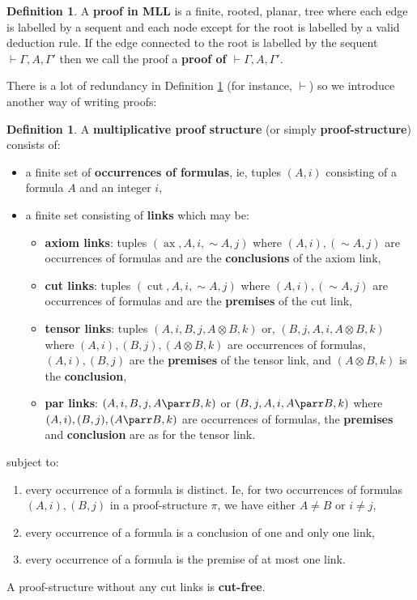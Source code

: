 \documentclass[12pt]{article}
\theoremstyle{plain}
\theoremstyle{definition}
\newtheorem{defn}[thm]{Definition} %
\newcommand{\negation}{\sim}
\begin{document}
\begin{defn}\label{def:proof}
A \textbf{proof in MLL} is a finite, rooted, planar, tree where each edge is labelled by a sequent and each node except for the root is labelled by a valid deduction rule. If the edge connected to the root is labelled by the sequent $\vdash \Gamma, A, \Gamma'$ then we call the proof a \textbf{proof of $\vdash \Gamma, A, \Gamma'$}.
\end{defn}
There is a lot of redundancy in Definition \ref{def:proof} (for instance, $\vdash$) so we introduce another way of writing proofs:
\begin{defn}\label{def:proof_structures}
A \textbf{multiplicative proof structure} (or simply \textbf{proof-structure}) consists of:
\begin{itemize}
    \item a finite set of \textbf{occurrences of formulas}, ie, tuples $(A,i)$ consisting of a formula $A$ and an integer $i$,
    \item a finite set consisting of \textbf{links} which may be:
    \begin{itemize}
        \item \textbf{axiom links}: tuples $(\operatorname{ax}, A,i,\negation A,j)$ where $(A,i),(\negation A,j)$ are occurrences of formulas and are the \textbf{conclusions} of the axiom link,
        \item \textbf{cut links}: tuples $(\operatorname{cut}, A,i,\negation A, j)$ where $(A,i),(\negation A,j)$ are occurrences of formulas and are the \textbf{premises} of the cut link,
        \item \textbf{tensor links}: tuples $(A,i,B,j, A \otimes B, k)$ or, $(B,j,A,i, A \otimes B, k)$ where $(A,i),(B,j),(A \otimes B, k)$ are occurrences of formulas, $(A,i),(B,j)$ are the \textbf{premises} of the tensor link, and $(A \otimes B, k)$ is the \textbf{conclusion},
        \item \textbf{par links}: $(A,i,B,j, A \parr B, k)$ or $(B,j,A,i, A \parr B, k)$ where $(A,i),(B,j),(A \parr B, k)$ are occurrences of formulas, the \textbf{premises} and \textbf{conclusion} are as for the tensor link.
    \end{itemize}
\end{itemize}
subject to:
\begin{enumerate}
    \item\label{def:proof_structure_distinct_occurrences} every occurrence of a formula is distinct. Ie, for two occurrences of formulas $(A,i),(B,j)$ in a proof-structure $\pi$, we have either $A \neq B$ or $i \neq j$, 
    \item\label{def:proof_structure_conclusions_one_link} every occurrence of a formula is a conclusion of one and only one link,
    \item\label{def:proof_structure_premise_one_link} every occurrence of a formula is the premise of at most one link.
\end{enumerate}
A proof-structure without any cut links is \textbf{cut-free}.
\end{defn}
\end{document}
